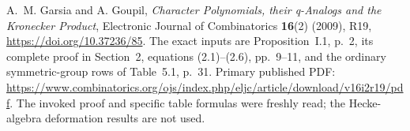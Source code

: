 A.~M. Garsia and A. Goupil,
\emph{Character Polynomials, their q-Analogs and the Kronecker Product},
Electronic Journal of Combinatorics \textbf{16}(2) (2009), R19,
\url{https://doi.org/10.37236/85}.
The exact inputs are Proposition~I.1, p.~2, its complete proof
in Section~2, equations (2.1)--(2.6), pp.~9--11, and the
ordinary symmetric-group rows of Table~5.1, p.~31.
Primary published PDF:
\url{https://www.combinatorics.org/ojs/index.php/eljc/article/download/v16i2r19/pdf}.
The invoked proof and specific table formulas were freshly read;
the Hecke-algebra deformation results are not used.
